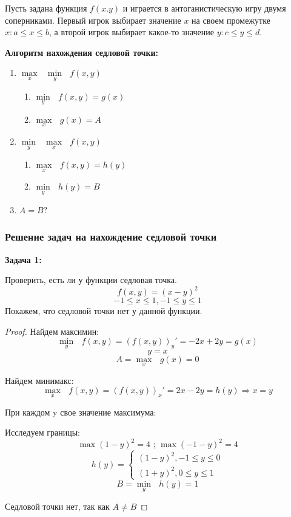 \documentclass[aps,%
12pt,%
final,%
oneside,
onecolumn,%
musixtex, %
superscriptaddress,%
centertags]{article} %
\theoremstyle{plain}
\theoremstyle{definition}
\theoremstyle{remark}
\begin{document}
Пусть задана функция $f(x.y)$ и играется в антоганистическую игру двумя соперниками. 
Первый игрок выбирает значение $x$ на своем промежутке $x:a \leq x \leq b$, а второй игрок выбирает какое-то значение $y: c \leq y \leq d$. 

\textbf{Алгоритм нахождения седловой точки:}

\begin{enumerate}
  \item $ \underset{x}{\max} \text{ }\underset{y}{\min} \text{ }  f(x,y) $
  \begin{enumerate}
    \item $ \underset{y}{\min} \text{ } f(x,y) = g(x) $
    \item $ \underset{x}{\max} \text{ } g(x) = A $
  \end{enumerate}
  \item $ \underset{y}{\min} \text{ }\underset{x}{\max} \text{ }  f(x,y) $
  \begin{enumerate}
    \item $ \underset{x}{\max} \text{ } f(x,y) = h(y) $
    \item $ \underset{y}{\min} \text{ } h(y) = B $
  \end{enumerate}
  \item $A = B ?$
\end{enumerate}

\subsubsection{Решение задач на нахождение седловой точки}

\textbf{Задача 1:}

Проверить, есть ли у функции седловая точка.
$$ f(x,y) = (x-y)^2 $$
$$ -1 \leq x \leq 1,-1 \leq y \leq 1 $$
Покажем, что седловой точки нет у данной функции.

\begin{proof}
  Найдем максимин:
  $$ \underset{y}{\min} \text{ } f(x,y) = (f(x,y))_y'  = -2x + 2y = g(x)$$
  $$ y = x $$
  $$ A = \underset{x}{\max} \text{ } g(x) = 0 $$

  Найдем минимакс:
  $$ \underset{x}{\max} \text{ } f(x,y) = (f(x,y))_x'  = 2x -  2y = h(y) \Rightarrow x = y$$

  При каждом y свое значение максимума:

  Исследуем границы:
  $$ \max (1-y)^2 = 4 \text{ ;  } \max (-1-y)^2 = 4 $$
  $$h(y) = \left\{\begin{matrix}
  (1-y)^2, -1 \leq y \leq 0\\ 
  (1+y)^2, 0 \leq y \leq 1
  \end{matrix}\right.$$
  $$ B = \underset{y}{\min} \text{ } h(y) = 1 $$

  Седловой точки нет, так как $A \neq B$
\end{proof}
\end{document}
